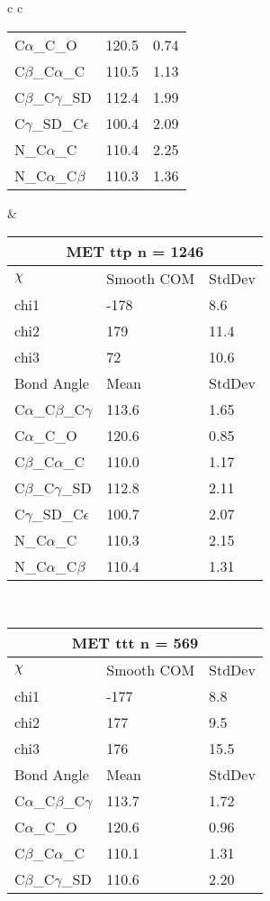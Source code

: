 \begin{longtable}{ c c }
\begin{tabular}{ l l l }
  C$\alpha$\_C\_O & 120.5 & 0.74\\
  C$\beta$\_C$\alpha$\_C & 110.5 & 1.13\\
  C$\beta$\_C$\gamma$\_SD & 112.4 & 1.99\\
  C$\gamma$\_SD\_C$\epsilon$ & 100.4 & 2.09\\
  N\_C$\alpha$\_C & 110.4 & 2.25\\
  N\_C$\alpha$\_C$\beta$ & 110.3 & 1.36\\
  \bottomrule
  \end{tabular}
  &
  \begin{tabular}{ l l l }
  \toprule
  \multicolumn{3}{c}{MET \textbf{ttp} n = 1246} \\ \toprule
  $\chi$       & Smooth COM & StdDev \\ \midrule
  chi1 & -178 & 8.6 \\ 
  chi2 & 179 & 11.4 \\ 
  chi3 & 72 & 10.6 \\ \midrule
  Bond Angle   & Mean     & StdDev \\ \midrule
  C$\alpha$\_C$\beta$\_C$\gamma$ & 113.6 & 1.65\\
  C$\alpha$\_C\_O & 120.6 & 0.85\\
  C$\beta$\_C$\alpha$\_C & 110.0 & 1.17\\
  C$\beta$\_C$\gamma$\_SD & 112.8 & 2.11\\
  C$\gamma$\_SD\_C$\epsilon$ & 100.7 & 2.07\\
  N\_C$\alpha$\_C & 110.3 & 2.15\\
  N\_C$\alpha$\_C$\beta$ & 110.4 & 1.31\\
  \bottomrule
  \end{tabular}
  \\
  \begin{tabular}{ l l l }
  \toprule
  \multicolumn{3}{c}{MET \textbf{ttt} n = 569} \\ \toprule
  $\chi$       & Smooth COM & StdDev \\ \midrule
  chi1 & -177 & 8.8 \\ 
  chi2 & 177 & 9.5 \\ 
  chi3 & 176 & 15.5 \\ \midrule
  Bond Angle   & Mean     & StdDev \\ \midrule
  C$\alpha$\_C$\beta$\_C$\gamma$ & 113.7 & 1.72\\
  C$\alpha$\_C\_O & 120.6 & 0.96\\
  C$\beta$\_C$\alpha$\_C & 110.1 & 1.31\\
  C$\beta$\_C$\gamma$\_SD & 110.6 & 2.20\\

\end{tabular}
\end{longtable}
